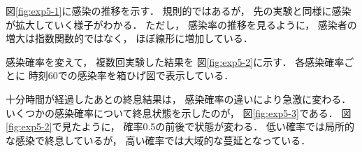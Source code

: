 \documentclass[10pt,oneside,fleqn]{scrartcl}
\begin{document}
図\ref{fig:exp5-1}に感染の推移を示す．
規則的ではあるが，
先の実験と同様に感染が拡大していく様子がわかる．
ただし，
感染率の推移を見るように，
感染者の増大は指数関数的ではなく，
ほぼ線形に増加している．

感染確率を変えて，
複数回実験した結果を
図\ref{fig:exp5-2}に示す．
各感染確率ごとに
時刻60での感染率を箱ひげ図で表示している．

\begin{figure}[htbp]
  \centering
  \myGraph*{}
\end{figure}

十分時間が経過したあとの終息結果は，
感染確率の違いにより急激に変わる．
いくつかの感染確率について終息状態を示したのが，
図\ref{fig:exp5-3}である．
図\ref{fig:exp5-2}で見たように，
確率0.5の前後で状態が変わる．
低い確率では局所的な感染で終息しているが，
高い確率では大域的な蔓延となっている．

\begin{figure*}%
  \centering
\end{figure*}
\end{document}
